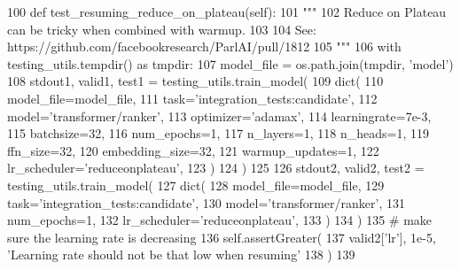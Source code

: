 \begin{DoxyCode}
100     \textcolor{keyword}{def }test\_resuming\_reduce\_on\_plateau(self):
101         \textcolor{stringliteral}{"""}
102 \textcolor{stringliteral}{        Reduce on Plateau can be tricky when combined with warmup.}
103 \textcolor{stringliteral}{}
104 \textcolor{stringliteral}{        See: https://github.com/facebookresearch/ParlAI/pull/1812}
105 \textcolor{stringliteral}{        """}
106         with testing\_utils.tempdir() \textcolor{keyword}{as} tmpdir:
107             model\_file = os.path.join(tmpdir, \textcolor{stringliteral}{'model'})
108             stdout1, valid1, test1 = testing\_utils.train\_model(
109                 dict(
110                     model\_file=model\_file,
111                     task=\textcolor{stringliteral}{'integration\_tests:candidate'},
112                     model=\textcolor{stringliteral}{'transformer/ranker'},
113                     optimizer=\textcolor{stringliteral}{'adamax'},
114                     learningrate=7e-3,
115                     batchsize=32,
116                     num\_epochs=1,
117                     n\_layers=1,
118                     n\_heads=1,
119                     ffn\_size=32,
120                     embedding\_size=32,
121                     warmup\_updates=1,
122                     lr\_scheduler=\textcolor{stringliteral}{'reduceonplateau'},
123                 )
124             )
125 
126             stdout2, valid2, test2 = testing\_utils.train\_model(
127                 dict(
128                     model\_file=model\_file,
129                     task=\textcolor{stringliteral}{'integration\_tests:candidate'},
130                     model=\textcolor{stringliteral}{'transformer/ranker'},
131                     num\_epochs=1,
132                     lr\_scheduler=\textcolor{stringliteral}{'reduceonplateau'},
133                 )
134             )
135             \textcolor{comment}{# make sure the learning rate is decreasing}
136             self.assertGreater(
137                 valid2[\textcolor{stringliteral}{'lr'}], 1e-5, \textcolor{stringliteral}{'Learning rate should not be that low when resuming'}
138             )
139 
\end{DoxyCode}
\mbox{\label{classtests_1_1test__transformers_1_1TestTransformerRanker_a2a4671741d853fa9ff5bf484ec98487c}} 
